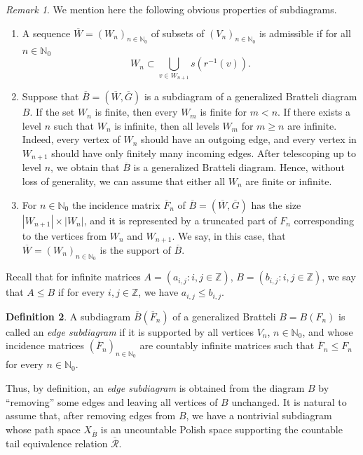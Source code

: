 \documentclass[11pt,reqno]{amsart}
\theoremstyle{definition}
\newtheorem{definition}{Definition}[section]
\theoremstyle{remark}
\newtheorem{remark}[definition]{Remark}
\theoremstyle{plain}
\def\ol{\overline}
\def\ov{\overline}
\newcommand{\N}{\mathbb N}
\newcommand{\Z}{\mathbb Z}
\newcommand{\mc}{\mathcal}
\numberwithin{equation}{section}
\begin{document}
\begin{remark} 
We mention here the following obvious properties of subdiagrams.
\begin{enumerate}
    \item A sequence $\ol W = (W_n)_{n \in \N_0}$ of subsets of $(V_n)_{n \in \N_0}$ is admissible if for all $n \in \N_0$
$$
W_n \subset \bigcup_{v \in W_{n+1}} s(r^{-1}(v)). 
$$
\item Suppose that $\ol B =(\ol W, \ol G)$ is a subdiagram of a generalized Bratteli diagram $B$. 
If the set $W_n$ is finite, then every $W_m$ is finite for $m < n$. If there exists a level $n$ such that $W_n$ is infinite, then all levels $W_m$ for $m \geq n$ are infinite. Indeed, every vertex of $W_n$ should have an outgoing edge, and every vertex in $W_{n+1}$ should have only finitely many incoming edges. After telescoping up to level $n$, we obtain that $\ov B$ is a generalized Bratteli diagram. Hence, without loss of generality, we can assume that either all $W_n$ are
finite or infinite.

\item For $n \in \N_0$ the incidence matrix $\ol F_n$ of $\overline B =  (\ol W, \ol G)$ has the size $|W_{n+1}| \times |W_n|$, and it is represented by a truncated part of $F_n$ corresponding to the vertices from $W_{n}$ and $W_{n+1}$. We say, in this case, that $\ol W = (W_n)_{n \in \N_0}$ is the support of $\ol B$.
\end{enumerate}
\end{remark} Recall that for infinite matrices $A = (a_{i,j}: i,j \in \Z)$, $B = (b_{i,j}: i,j \in \Z)$, we say that $A \leq B$ if for every $i,j \in \Z$, we have $a_{i,j} \leq b_{i,j}$.
\begin{definition}\label{Def_edge_Sub_dig} A subdiagram $\overline{B} (\overline{F}_n)$ of a generalized Bratteli $B= B(F_n)$ is called an {\em edge subdiagram} 
 if it is supported by all vertices $V_n$, $n \in \N_0$, and 
 whose incidence matrices $(\overline{F}_n)_{n \in \N_0}$ are countably infinite matrices such that $\overline{F}_n \leq F_n$ for every $n \in \mathbb{N}_0$. 
 \end{definition}
 Thus, by definition, an {\em edge subdiagram} is obtained from the diagram $B$ by ``removing'' some edges and leaving all vertices of $B$ unchanged. It is natural to assume that, after removing edges from $B$, we have a nontrivial subdiagram whose path space 
 $X_{\ol B}$ is an uncountable Polish space 
 supporting the countable tail equivalence relation $\ol{\mc R}$.
 
\end{document}
